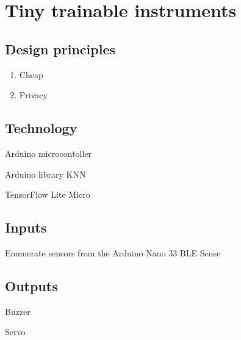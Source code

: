 \chapter{Tiny trainable instruments}

\section{Design principles}

\begin{enumerate}
  \item Cheap
  \item Privacy
\end{enumerate}

\section{Technology}

Arduino microcontoller

Arduino library KNN

TensorFlow Lite Micro

\section{Inputs}

Enumerate sensors from the Arduino Nano 33 BLE Sense

\section{Outputs}

Buzzer

Servo
